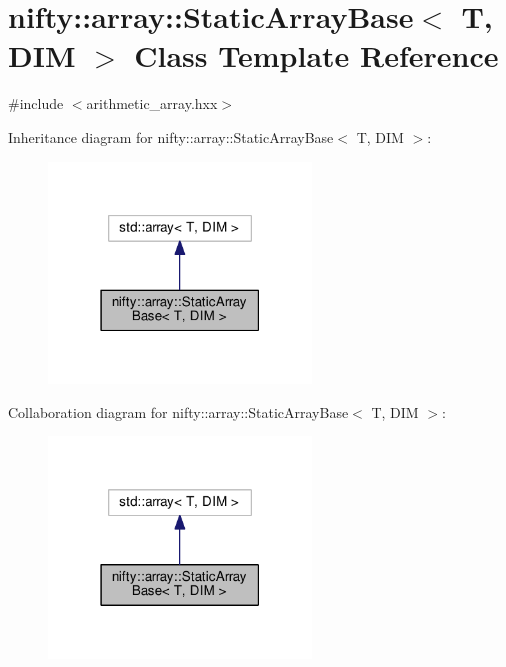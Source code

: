 \hypertarget{classnifty_1_1array_1_1StaticArrayBase}{}\section{nifty\+:\+:array\+:\+:Static\+Array\+Base$<$ T, D\+I\+M $>$ Class Template Reference}
\label{classnifty_1_1array_1_1StaticArrayBase}


{\ttfamily \#include $<$arithmetic\+\_\+array.\+hxx$>$}



Inheritance diagram for nifty\+:\+:array\+:\+:Static\+Array\+Base$<$ T, D\+I\+M $>$\+:\nopagebreak
\begin{figure}[H]
\begin{center}
\leavevmode
\includegraphics[width=198pt]{classnifty_1_1array_1_1StaticArrayBase__inherit__graph}
\end{center}
\end{figure}


Collaboration diagram for nifty\+:\+:array\+:\+:Static\+Array\+Base$<$ T, D\+I\+M $>$\+:\nopagebreak
\begin{figure}[H]
\begin{center}
\leavevmode
\includegraphics[width=198pt]{classnifty_1_1array_1_1StaticArrayBase__coll__graph}
\end{center}
\end{figure}
